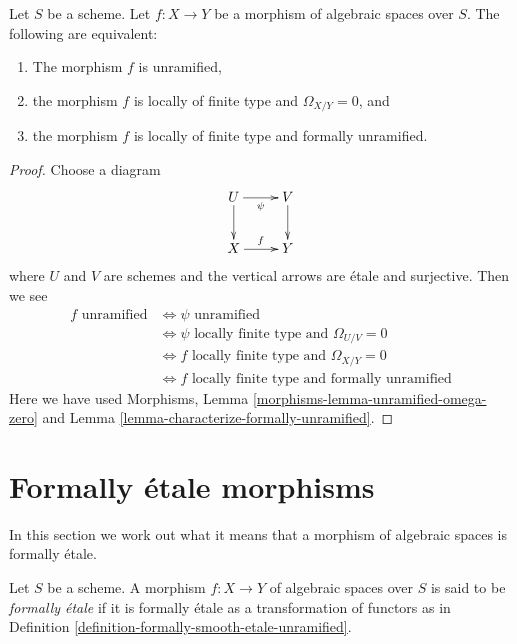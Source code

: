 \begin{lemma}
\label{lemma-unramified-formally-unramified}
Let $S$ be a scheme.
Let $f : X \to Y$ be a morphism of algebraic spaces over $S$.
The following are equivalent:
\begin{enumerate}
\item The morphism $f$ is unramified,
\item the morphism $f$ is locally of finite type and $\Omega_{X/Y} = 0$, and
\item the morphism $f$ is locally of finite type and formally unramified.
\end{enumerate}
\end{lemma}

\begin{proof}
Choose a diagram
$$
\xymatrix{
U \ar[d] \ar[r]_\psi & V \ar[d] \\
X \ar[r]^f & Y
}
$$
where $U$ and $V$ are schemes and the vertical arrows are \'etale and
surjective. Then we see
\begin{align*}
f\text{ unramified}
& \Leftrightarrow
\psi\text{ unramified} \\
& \Leftrightarrow
\psi\text{ locally finite type and }\Omega_{U/V} = 0 \\
& \Leftrightarrow
f\text{ locally finite type and }\Omega_{X/Y} = 0 \\
& \Leftrightarrow
f\text{ locally finite type and formally unramified}
\end{align*}
Here we have used 
Morphisms, Lemma \ref{morphisms-lemma-unramified-omega-zero} and
Lemma \ref{lemma-characterize-formally-unramified}.
\end{proof}









\section{Formally \'etale morphisms}
\label{section-formally-etale}

\noindent
In this section we work out what it means that a morphism of algebraic spaces
is formally \'etale.

\begin{definition}
\label{definition-formally-etale}
Let $S$ be a scheme. A morphism $f : X \to Y$ of algebraic spaces over $S$
is said to be {\it formally \'etale} if it is formally \'etale as a
transformation of functors as in
Definition \ref{definition-formally-smooth-etale-unramified}.
\end{definition}

